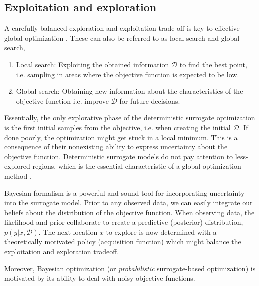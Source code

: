 \subsection{Exploitation and exploration}
A carefully balanced exploration and exploitation trade-off is key to effective 
global optimization \cite[11]{bayesoptbook}. These can also be referred to as 
local search and global search,
\begin{enumerate}
    \item Local search: Exploiting the obtained information $\mathcal{D}$ to find the best point,
    i.e. sampling in areas where the objective function is expected to be low. 
    \item Global search: Obtaining new information about the characteristics of the objective
    function i.e. improve $\mathcal{D}$ for future decisions.
\end{enumerate} 
Essentially, the only explorative phase of the deterministic surrogate optimization is the first
initial samples from the objective, i.e. when creating the initial $\mathcal{D}$. If done poorly,
the optimization might get stuck in a local minimum. This is a consequence of their nonexisting
ability to express uncertainty about the objective function. Deterministic surrogate models do not
pay attention to less-explored regions, which is the essential characteristic of a global
optimization method \cite{GlobalOptimization}. 

Bayesian formalism is a powerful and sound tool for incorporating uncertainty into the surrogate
model. Prior to any observed data, we can easily integrate our beliefs about the distribution of
the objective function. When observing data, the likelihood and prior collaborate to create a
predictive (posterior) distribution, $p(y|x,\mathcal{D})$. The next location $x$ to explore is now
determined with a theoretically motivated policy (acquisition function) which might balance the
exploitation and exploration tradeoff. 

Moreover, Bayesian optimization (or \textit{probabilistic} surrogate-based optimization) is motivated by
its ability to deal with noisy objective functions. 



